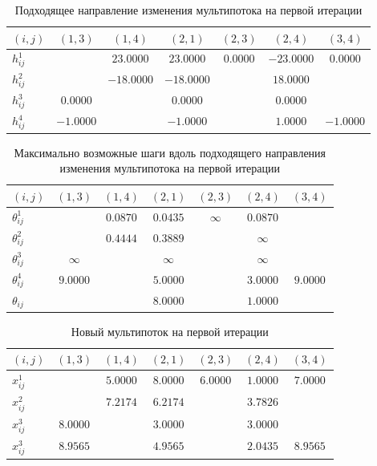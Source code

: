 \documentclass[a4paper,14pt,usenames,dvipsnames]{extreport}
\begin{document}
\begin{table}[H] 
\renewcommand{\arraystretch}{1.3}
\caption{Подходящее направление изменения мультипотока на первой итерации} \label{tab:t11}
\begin{center}
\begin{tabular}{|l|c|c|c|c|c|c|}
\hline$(i, j)$ & $(1,3)$ & $(1,4)$ & $(2,1)$ & $(2,3)$ & $(2,4)$ & $(3,4)$ \\
\hline$h_{i j}^{1}$ & & $23.0000$ & $23.0000$ & $0.0000$ & $-23.0000$ & $0.0000$\\
\hline$h_{i j}^{2}$ & & $-18.0000$ & $-18.0000$ & & $18.0000$ & \\
\hline$h_{i j}^{3}$ & $0.0000$ & & $0.0000$ & & $0.0000$ & \\
\hline$h_{i j}^{4}$ & $-1.0000$ & & $-1.0000$ & & $1.0000$ & $-1.0000$ \\
\hline
\end{tabular}
\end{center}
\end{table}

\begin{table}[H] 
\renewcommand{\arraystretch}{1.3}
\caption{Максимально возможные шаги вдоль подходящего направления изменения мультипотока на первой итерации} \label{tab:t11}
\begin{center}
\begin{tabular}{|l|c|c|c|c|c|c|}
\hline$(i, j)$ & $(1,3)$ & $(1,4)$ & $(2,1)$ & $(2,3)$ & $(2,4)$ & $(3,4)$ \\
\hline$\theta_{i j}^{1}$ & & $0.0870$ & $0.0435$ & $\infty$ & $0.0870$ & \\
\hline$\theta_{i j}^{2}$ & & $0.4444$ & $0.3889$ & & $\infty$ & \\
\hline$\theta_{i j}^{3}$ & $\infty$ & & $\infty$ & & $\infty$ & \\
\hline$\theta_{i j}^{4}$ & $9.0000$ & & $5.0000$ & & $3.0000$ & $9.0000$ \\
\hline$\theta_{i j}$ & & & $8.0000$ & & $1.0000$ & \\
\hline
\end{tabular}
\end{center}
\end{table}

\begin{table}[H] 
\renewcommand{\arraystretch}{1.3}
\caption{Новый мультипоток на первой итерации} \label{tab:t11}
\begin{center}
\begin{tabular}{|l|c|c|c|c|c|c|}
\hline$(i, j)$ & $(1,3)$ & $(1,4)$ & $(2,1)$ & $(2,3)$ & $(2,4)$ & $(3,4)$\\
\hline$x_{i j}^{1}$ & & $5.0000$ & $8.0000$ & $6.0000$ & $1.0000$ & $7.0000$ \\
\hline$x_{i j}^{2}$ & & $7.2174$ & $6.2174$ & & $3.7826$ & \\
\hline$x_{i j}^{3}$ & $8.0000$ & & $3.0000$ & & $3.0000$ & \\
\hline$x_{i j}^{3}$ & $8.9565$ & & $4.9565$ & & $2.0435$ & $8.9565$ \\
\hline
\end{tabular}
\end{center}
\end{table}
\end{document}
